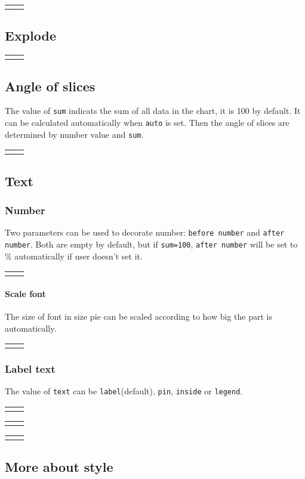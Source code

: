 \documentclass{article}
\newcommand{\demo}[2][1]{
  \begin{center}
  \begin{tabular}{cc}
    \begin{minipage}{.49\linewidth}
      \centering
      \resizebox{#1\linewidth}{!}{
        
      }
    \end{minipage}
    &
    \begin{minipage}{.45\linewidth}
      
    \end{minipage}
  \end{tabular}
  \end{center}
}
\begin{document}
\demo{color}

\subsection{Explode}
\demo{explode}

\subsection{Angle of slices}
The value of \texttt{sum} indicats the sum of all data in the chart,
it is 100 by default. It can be calculated automatically when
\texttt{auto} is set. Then the angle of slices are determined by
number value and \texttt{sum}.

\demo{sum}

\subsection{Text}

\subsubsection{Number}
Two parameters can be used to decorate number: \texttt{before number}
and \texttt{after number}. Both are empty by default, but if
\texttt{sum=100}, \texttt{after number} will be set to \%
automatically if user doesn't set it.

\demo[0.6]{before-after-number}

\paragraph{Scale font}
The size of font in size pie can be scaled according to how big the
part is automatically.

\demo[0.6]{scalefont}

\subsubsection{Label text}
The value of \texttt{text} can be \texttt{label}(default),
\texttt{pin}, \texttt{inside} or \texttt{legend}.

\demo[0.6]{text}

\demo[0.5]{text-inside}

\demo[0.6]{legend}

\subsection{More about style}
\end{document}
